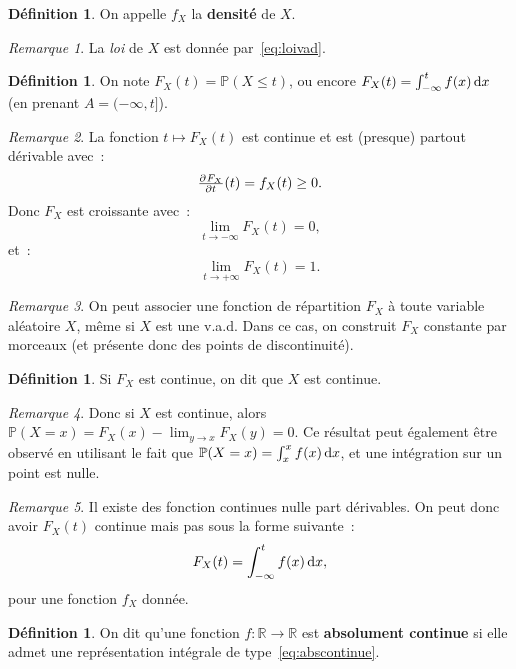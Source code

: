 \documentclass{article}
\renewcommand{\P}{\mathbb P}
\newcommand{\R}{\mathbb R}
\theoremstyle{definition}
\newtheorem{déf}[thm]{Définition}
\theoremstyle{remark}
\newtheorem*{rmq}{Remarque}
\begin{document}
		\begin{déf} On appelle $f_X$ la \textbf{densité} de $X$. \end{déf}

		\begin{rmq} La \emph{loi} de $X$ est donnée par~\eqref{eq:loivad}. \end{rmq}

		\begin{déf} On note $F_X(t) = \P(X \leq t)$, ou encore $F_X(t) = \int_{-\infty}^tf(x)\dif x$ (en prenant $A = (-\infty, t]$). \end{déf}

		\begin{rmq} La fonction $t \mapsto F_X(t)$ est continue et est (presque) partout dérivable avec~:
		\[\pd{F_X}t(t) = f_X(t) \geq 0.\]
		Donc $F_X$ est croissante avec~:
		\[\lim_{t \to -\infty}F_X(t) = 0,\]
		et~:
		\[\lim_{t \to +\infty}F_X(t) = 1.\]
		\end{rmq}

		\begin{rmq} On peut associer une fonction de répartition $F_X$ à toute variable aléatoire $X$, même si $X$ est une v.a.d. Dans ce cas, on construit $F_X$
		constante par morceaux (et présente donc des points de discontinuité). \end{rmq}

		\begin{déf} Si $F_X$ est continue, on dit que $X$ est continue. \end{déf}

		\begin{rmq} Donc si $X$ est continue, alors $\P(X = x) = F_X(x) - \lim_{y \to x}F_X(y) = 0$. Ce résultat peut également être observé en utilisant le fait
		que $\P(X = x) = \int_x^x f(x)\dif x$, et une intégration sur un point est nulle. \end{rmq}

		\begin{rmq} Il existe des fonction continues nulle part dérivables. On peut donc avoir $F_X(t)$ continue mais pas sous la forme suivante~:
		\begin{equation}\label{eq:abscontinue}
			F_X(t) = \int_{-\infty}^tf(x)\dif x,
		\end{equation}
		pour une fonction $f_X$ donnée.
		\end{rmq}

		\begin{déf} On dit qu'une fonction $f : \R \to \R$ est \textbf{absolument continue} si elle admet une représentation intégrale de
		type~\eqref{eq:abscontinue}. \end{déf}
\end{document}
